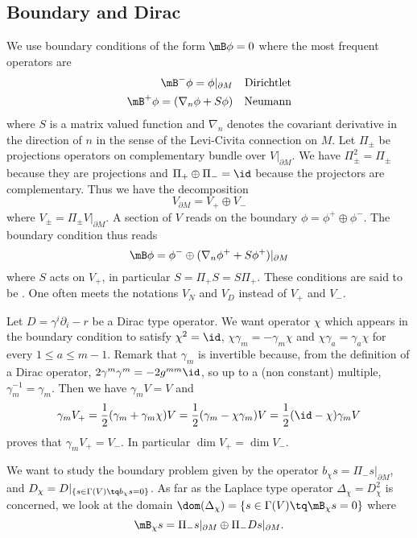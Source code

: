 \subsection{Boundary and Dirac}

We use boundary conditions of the form $\mB\phi=0$ where the most frequent operators are
\begin{align*}
		\mB^-\phi=\phi|_{\partial M}		&&\text{Dirichtlet}\\
		\mB^+\phi=(\nabla_n\phi+S\phi)		&&\text{Neumann}
\end{align*}
where $S$ is a matrix valued function and $\nabla_n$ denotes the covariant derivative in the direction of $n$ in the sense of the Levi-Civita connection on $M$. Let $\Pi_{\pm}$ be projections operators on complementary bundle over $V|_{\partial M}$. We have $\Pi_{\pm}^2=\Pi_{\pm}$ because they are projections and $\Pi_{+}\oplus\Pi_-=\id$ because the projectors are complementary. Thus we have the decomposition
\[ 
  V_{\partial M}=V_+\oplus V_-
\]
where $V_{\pm}=\Pi_{\pm}V|_{\partial M}$. A section of $V$ reads on the boundary $\phi=\phi^+\oplus\phi^-$. The boundary condition thus reads
\begin{equation}
\mB\phi=\phi^-\oplus(\nabla_n\phi^++S\phi^+)|_{\partial M}
\end{equation}
where $S$ acts on $V_+$, in particular $S=\Pi_+S=S\Pi_+$. These conditions are said to be . One often meets the notations $V_N$ and $V_D$ instead of $V_+$ and $V_-$.


Let $D=\gamma^i\partial_i-r$ be a Dirac type operator. We want operator $\chi$ which appears in the boundary condition to satisfy $\chi^2=\id$, $\chi\gamma_m=-\gamma_m\chi$ and $\chi\gamma_a=\gamma_a\chi$ for every $1\leq a\leq m-1$. Remark that $\gamma_m$ is invertible because, from the definition of a Dirac operator, $2\gamma^m\gamma^m=-2g^{mm}\id$, so up to a (non constant) multiple, $\gamma_m^{-1}=\gamma_m$. Then we have $\gamma_mV=V$ and
\[ 
  \gamma_mV_+=\frac{ 1 }{2}(\gamma_m+\gamma_m\chi)V=\frac{ 1 }{2}(\gamma_m-\chi\gamma_m)V=\frac{ 1 }{2}(\id-\chi)\gamma_mV
\]
proves that $\gamma_mV_+=V_-$. In particular $\dim V_+=\dim V_-$.

We want to study the boundary problem given by the operator $b_{\chi}s=\Pi_-s|_{\partial M}$, and $D_{\chi}=D|_{\{ s\in\Gamma(V)\tq b_{\chi}s=0 \}}$. As far as the Laplace type operator $\Delta_{\chi}=D_{\chi}^2$ is concerned, we look at the domain $\dom(\Delta_{\chi})=\{ s\in\Gamma(V)\tq \mB_{\chi}s=0 \}$ where
\begin{equation}
  \mB_{\chi}s=\Pi_-s|_{\partial M}\oplus\Pi_-Ds|_{\partial M}.
\end{equation}

